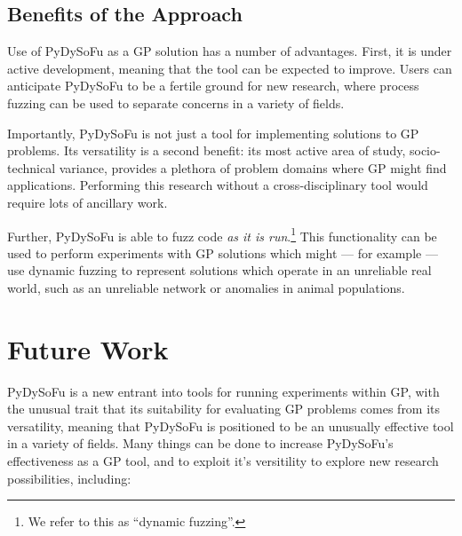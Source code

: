\documentclass[draft,12pt]{llncs} %
\begin{document}
\subsection{Benefits of the Approach}
Use of PyDySoFu as a GP solution has a number of advantages. First, it is under
active development, meaning that the tool can be expected to improve. Users can
anticipate PyDySoFu to be a fertile ground for new research, where process
fuzzing can be used to separate concerns in a variety of fields.\par

Importantly, PyDySoFu is not just a tool for implementing solutions to GP
problems. Its versatility is a second benefit: its most active area of study,
socio-technical variance, provides a plethora of problem domains where GP might
find applications. Performing this research without a cross-disciplinary tool
would require lots of ancillary work.\par

Further, PyDySoFu is able to fuzz code \emph{as it is run}.\footnote{We refer to
  this as ``dynamic fuzzing''.} This functionality can be used to perform
experiments with GP solutions which might --- for example --- use dynamic
fuzzing to represent solutions which operate in an unreliable real world, such
as an unreliable network or anomalies in animal populations.\par


\section{Future Work}
\label{sec:future_work}

PyDySoFu is a new entrant into tools for running experiments within GP, with the
unusual trait that its suitability for evaluating GP problems comes from its
versatility, meaning that PyDySoFu is positioned to be an unusually effective
tool in a variety of fields. Many things can be done to increase PyDySoFu's
effectiveness as a GP tool, and to exploit it's versitility to explore new
research possibilities, including:
\end{document}
